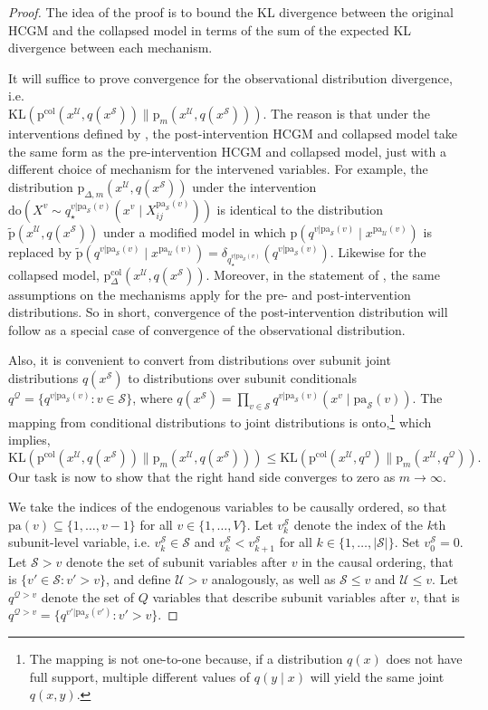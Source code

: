 \documentclass[12pt]{article}
\newcommand{\Sc}{\mathcal{S}}
\newcommand{\Uc}{\mathcal{U}}
\newcommand{\Qc}{\mathcal{Q}}
\newcommand{\rmdo}{\mathrm{do}}
\newcommand{\pa}{\mathrm{pa}}
\newcommand{\pr}{\mathrm{p}}
\newcommand{\col}{\mathrm{col}}
\begin{document}
\begin{proof}
The idea of the proof is to bound the KL divergence between the original HCGM and the collapsed model in terms of the sum of the expected KL divergence between each mechanism.

It will suffice to prove convergence for the observational distribution divergence, i.e.\\ $\mathrm{KL}(\pr^\col(x^\Uc, q(x^\Sc)) \| \pr_m(x^\Uc, q(x^\Sc)))$. The reason is that under the interventions defined by , the post-intervention HCGM and collapsed model take the same form as the pre-intervention HCGM and collapsed model, just with a different choice of mechanism for the intervened variables.
For example, the distribution $\pr_{\Delta,m}(x^\Uc, q(x^\Sc))$ under the intervention $\rmdo(X^v \sim q_\star^{v|\pa_\Sc(v)}(x^v \mid X_{ij}^{\pa_\Sc(v)}))$ is identical to the distribution $\tilde{\pr}(x^\Uc, q(x^\Sc))$ under a modified model in which $\pr(q^{v|\pa_\Sc(v)} \mid x^{\pa_\Uc(v)})$ is replaced by $\tilde{\pr}(q^{v|\pa_\Sc(v)} \mid x^{\pa_\Uc(v)}) = \delta_{q_\star^{v|\pa_\Sc(v)}}(q^{v|\pa_\Sc(v)})$.
Likewise for the collapsed model, $\pr_\Delta^\col(x^\Uc, q(x^\Sc))$.
Moreover, in the statement of , the same assumptions on the mechanisms apply for the pre- and post-intervention distributions.
So in short, convergence of the post-intervention distribution will follow as a special case of convergence of the observational distribution.

Also, it is convenient to convert from distributions over subunit joint distributions $q(x^\Sc)$ to distributions over subunit conditionals $q^\mathcal{Q} = \{q^{v|\pa_\Sc(v)}: v \in \Sc\}$, where $q(x^\Sc) = \prod_{v \in \Sc}q^{v|\pa_\Sc(v)}(x^v \mid \pa_\Sc(v))$. 
The mapping from conditional distributions to joint distributions is onto,\footnote{The mapping is not one-to-one because, if a distribution $q(x)$ does not have full support, multiple different values of $q(y\mid x)$ will yield the same joint $q(x, y)$.} which implies,
\begin{equation*}
	\mathrm{KL}(\pr^\col(x^\Uc, q(x^\Sc)) \| \pr_m(x^\Uc, q(x^\Sc))) \le \mathrm{KL}(\pr^\col(x^\Uc, q^\mathcal{Q}) \| \pr_m(x^\Uc, q^\mathcal{Q})).
\end{equation*}
Our task is now to show that the right hand side converges to zero as $m \to \infty$.

We take the indices of the endogenous variables to be causally ordered, so that $\pa(v) \subseteq \{1, \ldots, v-1\}$ for all $v \in \{1, \ldots, V\}$.
Let $v^\Sc_{k}$ denote the index of the $k$th subunit-level variable, i.e. $v^\Sc_{k} \in \Sc$ and $v^\Sc_{k} < v^\Sc_{k+1}$ for all $k \in \{1, \ldots, |\Sc|\}$.
Set $v^\Sc_0 = 0$.
Let $\Sc > v$ denote the set of subunit variables after $v$ in the causal ordering, that is $\{v' \in \mathcal{S}: v' > v\}$, and define $\Uc > v$ analogously, as well as $\Sc \le v$ and $\Uc \le v$.
Let $q^{\Qc > v}$ denote the set of $Q$ variables that describe subunit variables after $v$, that is $q^{\Qc > v} = \{q^{v'|\pa_\Sc(v')} : v' > v\}$.


\end{proof}
\end{document}
